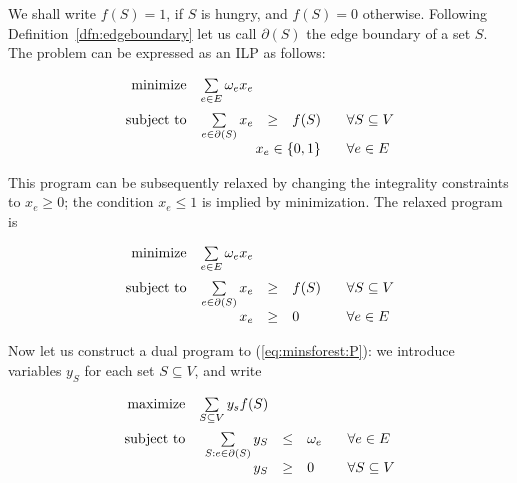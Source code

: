 \noindent
We shall write $f(S)=1$, if $S$ is hungry, and $f(S)=0$ otherwise. 
Following Definition~\ref{dfn:edgeboundary} let us call  $\partial(S)$
the edge boundary of a set $S$. The problem \minsforest can be expressed as an ILP as follows:

\begin{equation}
  \label{eq:minsforest:ILP}
\begin{array}{rrcll}
  {\rm minimize}     & \multicolumn{1}{l}{\sum\limits_{e\in E}\omega_ex_e}\\[3ex]
  {\rm subject\ to} & \sum\limits_{e\in\partial(S)}x_e&\ge&f(S)& \;\;\;\forall S\subseteq V\\
                          & \multicolumn{3}{r}{x_e\in\{0,1\}}& \;\;\;\forall e\in E\\
\end{array}
\end{equation}

\noindent 
This program can be subsequently relaxed by changing the integrality constraints to  $x_e\ge0$;
the condition $x_e\le1$ is implied by minimization. The relaxed program is

\begin{equation}
  \label{eq:minsforest:P}
\begin{array}{rrcll}
  {\rm minimize}     & \multicolumn{1}{l}{\sum\limits_{e\in E}\omega_ex_e}\\[3ex]
  {\rm subject\ to} & \sum\limits_{e\in\partial(S)}x_e&\ge&f(S)& \;\;\;\forall S\subseteq V\\
                          & x_e &\ge&0& \;\;\;\forall e\in E\\
\end{array}
\end{equation}

\noindent
Now let us construct a dual program to  (\ref{eq:minsforest:P}): we introduce variables $y_S$
for each set  $S\subseteq V$, and write

\begin{equation}
  \label{eq:minsforest:D}
\begin{array}{rrcll}
  {\rm maximize}     & \multicolumn{1}{l}{\sum\limits_{S\subseteq V}y_sf(S)}\\[3ex]
  {\rm subject\ to} & \sum\limits_{S:e\in\partial(S)}y_S&\le&\omega_e& \;\;\;\forall e\in E\\
                          & y_S &\ge&0& \;\;\;\forall S\subseteq V\\
\end{array}
\end{equation}

